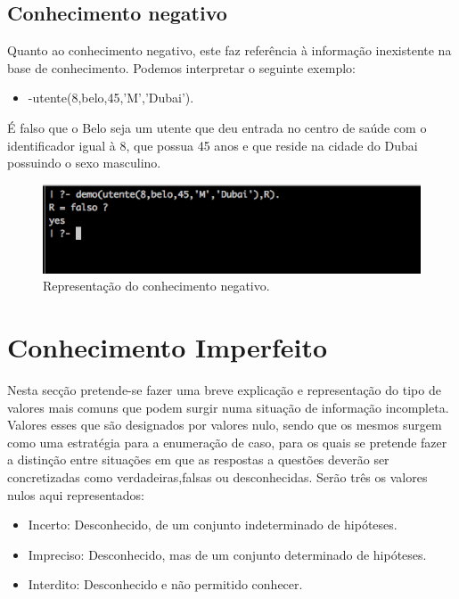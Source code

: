 \documentclass[25pt]{article}
\begin{document}
\subsection{Conhecimento negativo}

Quanto ao conhecimento negativo, este faz referência à informação inexistente na base de conhecimento.
Podemos interpretar o seguinte exemplo:

\begin{itemize}
\item -utente(8,belo,45,'M','Dubai').
\end{itemize}

É falso que o Belo seja um utente que deu entrada no centro de saúde com o identificador igual à 8, que possua 45 anos e que reside na cidade
do Dubai possuindo o sexo masculino.

\begin{figure}[H]
\centering\includegraphics[scale=0.55]{negativo}
\caption{\label{fig:controller}Representação do conhecimento negativo.}
\end{figure}


\section{Conhecimento Imperfeito}

Nesta secção pretende-se fazer uma breve explicação e representação do tipo de valores mais comuns que podem surgir
numa situação de informação incompleta. Valores esses que são designados por valores nulo, sendo que os mesmos surgem como
uma estratégia para a enumeração de caso, para os quais se pretende fazer a distinção entre situações em que as respostas a questões
deverão ser concretizadas como verdadeiras,falsas ou desconhecidas.\newline
Serão três os valores nulos aqui representados:
\begin{itemize}
\item Incerto: Desconhecido, de um conjunto indeterminado de hipóteses.
\item Impreciso: Desconhecido, mas de um conjunto determinado de hipóteses.
\item Interdito: Desconhecido e não permitido conhecer.
\end{itemize}
\end{document}
